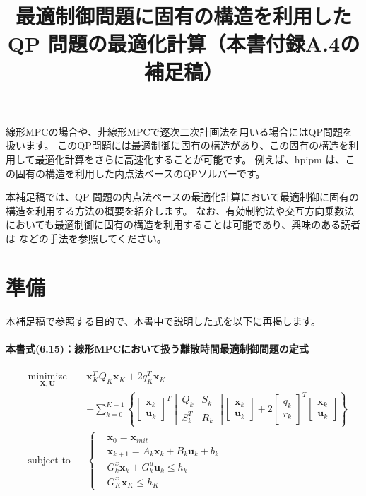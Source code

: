 \documentclass[a4paper]{jarticle}
\title{最適制御問題に固有の構造を利用した QP 問題の最適化計算（本書\cite{fukatsu2024python}付録A.4の補足稿）}
\begin{document}
\maketitle

線形MPCの場合や、非線形MPCで逐次二次計画法を用いる場合にはQP問題を扱います。
このQP問題には最適制御に固有の構造があり、この固有の構造を利用して最適化計算をさらに高速化することが可能です。
例えば、hpipm \cite{frison2020hpipm}は、この固有の構造を利用した内点法ベースのQPソルバーです。


本補足稿では、QP 問題の内点法ベースの最適化計算において最適制御に固有の構造を利用する方法の概要を紹介します。
なお、有効制約法や交互方向乗数法においても最適制御に固有の構造を利用することは可能であり、興味のある読者は \cite{nielsen2017low,sokoler2014input} などの手法を参照してください。

\section*{準備}
本補足稿で参照する目的で、本書\cite{fukatsu2024python}中で説明した式を以下に再掲します。

\paragraph{本書\cite{fukatsu2024python}式(6.15)：線形MPCにおいて扱う離散時間最適制御問題の定式}

\begin{equation}
\begin{aligned}
& \underset{ {\mathbf{X}},{\mathbf{U}}}{\text{minimize}} && 
\mathbf{x}_K^TQ_K\mathbf{x}_K + 2 q_K^T\mathbf{x}_K
\\
&&&
+
\sum_{k=0}^{K-1}
\left\{
\begin{bmatrix} \mathbf{x}_k \\ \mathbf{u}_k\end{bmatrix}^T
\begin{bmatrix} Q_k & S_k \\ S_k^T & R_k \end{bmatrix}
\begin{bmatrix} \mathbf{x}_k \\ \mathbf{u}_k\end{bmatrix}
+
2\begin{bmatrix} q_k \\ r_k\end{bmatrix}^T
\begin{bmatrix} \mathbf{x}_k \\ \mathbf{u}_k\end{bmatrix}
\right\}
\\
&\text{subject to} && \left \{
\begin{aligned}
    & \mathbf{x}_0 = \bar{\mathbf{x}}_{init}\\
    & \mathbf{x}_{k+1} = A_k \mathbf{x}_k + B_k \mathbf{u}_k + b_k\\
    & G^{x}_k \mathbf{x}_k + G^{u}_k\mathbf{u}_k \le h_k\\
    & G^{x}_K\mathbf{x}_K\le h_K
\end{aligned}
\right .
\end{aligned}
\label{eq:ocp_qp}
\end{equation}
\end{document}
